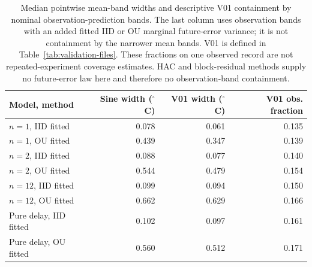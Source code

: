 \begin{table}[tbp]
\centering\small
\begin{tabular}{lrrr}
\toprule
Model, method & \shortstack{Sine width\\(${}^\circ$C)} & \shortstack{V01 width\\(${}^\circ$C)} & V01 obs. fraction \\
\midrule
$n=1$, IID fitted & 0.078 & 0.061 & 0.135 \\
$n=1$, OU fitted & 0.439 & 0.347 & 0.139 \\
$n=2$, IID fitted & 0.088 & 0.077 & 0.140 \\
$n=2$, OU fitted & 0.544 & 0.479 & 0.154 \\
$n=12$, IID fitted & 0.099 & 0.094 & 0.150 \\
$n=12$, OU fitted & 0.662 & 0.629 & 0.166 \\
Pure delay, IID fitted & 0.102 & 0.097 & 0.161 \\
Pure delay, OU fitted & 0.560 & 0.512 & 0.171 \\
\bottomrule
\end{tabular}
\caption{Median pointwise mean-band widths and descriptive V01 containment by nominal observation-prediction bands. The last column uses observation bands with an added fitted IID or OU marginal future-error variance; it is not containment by the narrower mean bands. V01 is defined in Table~\ref{tab:validation-files}. These fractions on one observed record are not repeated-experiment coverage estimates. HAC and block-residual methods supply no future-error law here and therefore no observation-band containment.}
\label{tab:prediction-widths}
\end{table}
